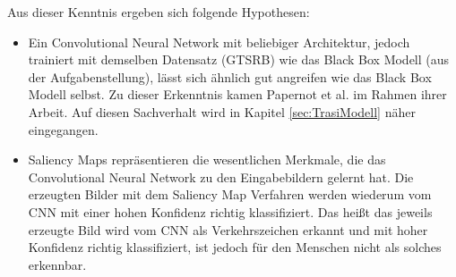 Aus dieser Kenntnis ergeben sich folgende Hypothesen:
\begin{itemize}
	\item Ein Convolutional Neural Network mit beliebiger Architektur, jedoch trainiert mit demselben Datensatz (\ac{GTSRB}) wie das Black Box Modell (aus der Aufgabenstellung), lässt sich ähnlich gut angreifen wie das Black Box Modell selbst. Zu dieser Erkenntnis kamen Papernot et al. \cite{papernot_+_2016} im Rahmen ihrer Arbeit. Auf diesen Sachverhalt wird in Kapitel \ref{sec:TrasiModell} näher eingegangen.
	\item 	Saliency Maps repräsentieren die wesentlichen Merkmale, die das Convolutional Neural Network zu den Eingabebildern gelernt hat. Die erzeugten Bilder mit dem Saliency Map Verfahren werden wiederum vom \ac{CNN} mit einer hohen Konfidenz richtig klassifiziert. Das heißt das jeweils erzeugte Bild wird vom \ac{CNN} als Verkehrszeichen erkannt und mit hoher Konfidenz richtig klassifiziert, ist jedoch für den Menschen nicht als solches erkennbar.
\end{itemize}

%
%
%
%


